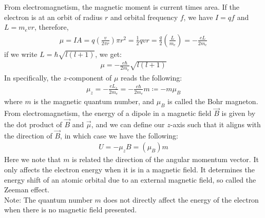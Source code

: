 \documentclass[11pt]{article}
\theoremstyle{break}
\theoremstyle{break}
\newcommand{\note}{\color{red}Note: \color{black}}
\begin{document}
\newpage
From electromagnetism, the magnetic moment is current times area. If the electron is at an orbit of radius $r$ and orbital frequency $f$, we have $I = qf$ and $L=m_evr$, therefore,
\begin{align*}
\mu = IA= q \left( \frac{v}{2\pi r}\right) \pi r^2 = \frac{1}{2}qvr = \frac{q}{2}\left( \frac{L}{m_e}\right) = -\frac{eL}{2m_e}
\end{align*}
if we write $L = \hbar \sqrt{l(l+1)}$, we get:
\begin{align*}
\mu = -\frac{e\hbar}{2m_e}\sqrt{l(l+1)}
\end{align*}
In specifically, the $z$-component of $\mu$ reads the following:
\begin{align*}
\mu_z = -\frac{eL_z}{2m_e} = -\frac{e\hbar}{2m_e}m \coloneqq -m \mu_B
\end{align*}
where $m$ is the magnetic quantum number, and $\mu_B$ is called the Bohr magneton. From electromagnetism, the energy of a dipole in a magnetic field $\vec{B}$ is given by the dot product of $\vec{B}$ and $\vec{\mu}$, and we can define our $z$-axis such that it aligns with the direction of $\vec{B}$, in which case we have the following:
\begin{align*}
U = -\mu_z B = (\mu_B)m
\end{align*}
Here we note that $m$ is related the direction of the angular momentum vector. It only affects the electron energy when it is in a magnetic field. It determines the energy shift of an atomic orbital due to an external magnetic field, so called the Zeeman effect. \\

\note The quantum number $m$ does not directly affect the energy of the electron when there is no magnetic field presented. 

\newpage
\end{document}
